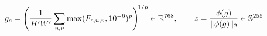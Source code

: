 \documentclass[preview]{standalone}
\begin{document}
\begin{align*}
\special{dvisvgm:raw <g id='unique000'>}g_c = \left(\frac{1}{H'W'}\sum_{u,v} \max(F_{c,u,v}, 10^{-6})^p\right)^{\!1/p} \in \mathbb{R}^{768}, \qquad z = \frac{\phi(g)}{\|\phi(g)\|_2} \in \mathbb{S}^{255}\special{dvisvgm:raw </g>}
\end{align*}
\end{document}
